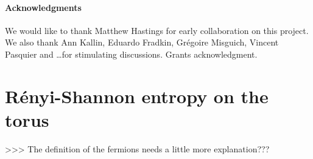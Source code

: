 \documentclass[11pt]{iopart}
\begin{document}
\paragraph{Acknowledgments}
 We would like to thank Matthew Hastings for early collaboration on this project. We also thank Ann Kallin, Eduardo Fradkin, Gr\'egoire Misguich, Vincent Pasquier and \ldots for stimulating discussions. Grants acknowledgment. 
 \appendix
 \clearpage

\section[\;\;\;\;\;\;\;\;\;\;\;\;\;\;R\'enyi-Shannon entropy on the torus]{R\'enyi-Shannon entropy on the torus}
\label{sec:lgv}
>>> The definition of the fermions needs a little more explanation???
\end{document}
